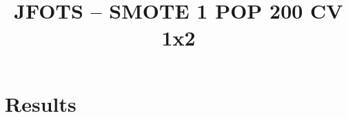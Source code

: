 \documentclass{llncs}
\title{JFOTS -- SMOTE 1 POP 200 CV 1x2}
\begin{document}
\maketitle

\section{Results}
































\end{document}
